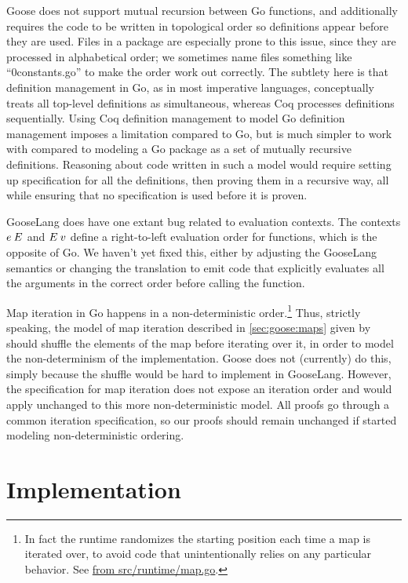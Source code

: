 Goose does not support mutual recursion between Go functions, and
additionally requires the code to be written in topological order so
definitions appear before they are used. Files in a package are especially prone
to this issue, since they are processed in alphabetical order; we sometimes name
files something like ``0constants.go'' to make the order work out correctly.
The subtlety here is that
definition management in Go, as in most imperative languages,
conceptually treats all top-level definitions as simultaneous, whereas
Coq processes definitions sequentially. Using Coq definition management
to model Go definition management imposes a limitation compared to Go,
but is much simpler to work with compared to modeling a Go package as a
set of mutually recursive definitions. Reasoning about code written in such a
model would require setting up specification for all the definitions, then
proving them in a recursive way, all while ensuring that no specification is
used before it is proven.

GooseLang does have one extant bug related to evaluation contexts. The contexts
$e \: E$ and $E \: v$ define a right-to-left evaluation order for functions,
which is the opposite of Go. We haven't yet fixed this, either by adjusting the
GooseLang semantics or changing the translation to emit code that explicitly
evaluates all the arguments in the correct order before calling the function.

Map iteration in Go happens in a non-deterministic order.\footnote{In fact the
runtime randomizes the starting position each time a map is iterated over, to avoid code that
unintentionally relies on any particular behavior. See
\href{https://github.com/golang/go/blob/c379c3d58d5482f4c8fe97466a99ce70e630ad44/src/runtime/map.go\#L844-L850}%
{ from src/runtime/map.go}.} Thus, strictly speaking, the model
of map iteration described in \cref{sec:goose:maps} given by  should
shuffle the elements of the map before iterating over it, in order to model the
non-determinism of the implementation. Goose does not (currently) do this,
simply because the shuffle would be hard to implement in GooseLang. However, the
specification for map iteration does not expose an iteration order and would
apply unchanged to this more non-deterministic model. All proofs go through a
common iteration specification, so our proofs should remain unchanged if
 started modeling non-deterministic ordering.

\section{Implementation}%
\label{sec:goose:impl}


